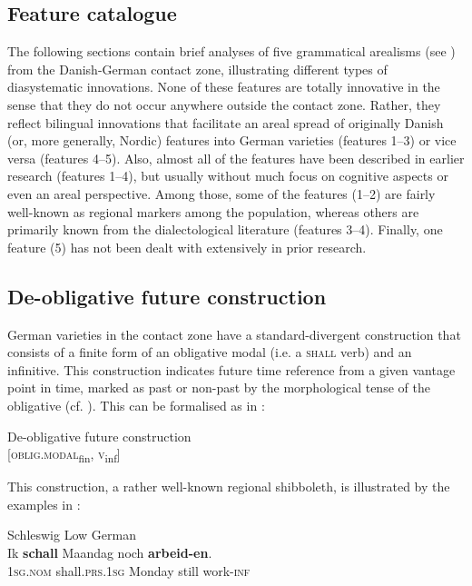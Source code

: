 \documentclass[output=paper]{langsci/langscibook}
\begin{document}
 \subsection{Feature catalogue}
 \label{sec:hoeder:4.1}

The following sections contain brief analyses of five grammatical arealisms (see ) from the Danish-German contact zone, illustrating different types of diasystematic innovations. None of these features are totally innovative in the sense that they do not occur anywhere outside the contact zone. Rather, they reflect bilingual innovations that facilitate an areal spread of originally Danish (or, more generally, Nordic) features into German varieties (features 1--3) or vice versa (features 4--5). Also, almost all of the features have been described in earlier research (features 1--4), but usually without much focus on cognitive aspects or even an areal perspective. Among those, some of the features (1--2) are fairly well-known as regional markers among the population, whereas others are primarily known from the dialectological literature (features 3--4). Finally, one feature (5) has not been dealt with extensively in prior research.



\subsection{De-obligative future construction}
\label{sec:hoeder:4.2}

German varieties in the contact zone have a standard-divergent construction that consists of a finite form of an obligative modal (i.e. a \textsc{shall} verb) and an infinitive. This construction indicates future time reference from a given vantage point in time, marked as past or non-past by the morphological tense of the obligative (cf. \citealt[300--303]{Hoder.2016b}). This can be formalised as in :

\ea\label{ex:hoeder:2}
	De-obligative future construction\\
    {[}\textsc{oblig.modal}\textsubscript{fin}, \textsc{v}\textsubscript{inf}{]}
\z
    
This construction, a rather well-known regional shibboleth, is illustrated by the examples in :


\ea\label{ex:hoeder:3}
	\ea\label{ex:hoeder:3a}
	Schleswig Low German\\
	\gll Ik \textbf{schall} Maandag noch \textbf{arbeid-en}.\\
     \textsc{1sg.nom} shall\textsc{.prs.1sg} Monday still work-\textsc{inf}\\
	
\end{document}
